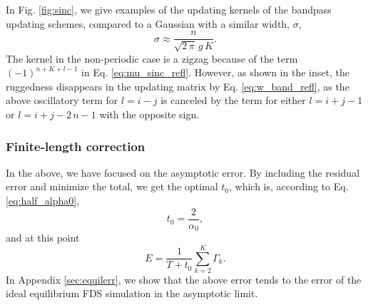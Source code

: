 \documentclass[reprint, floatfix]{revtex4-1}
\begin{document}
In Fig. \ref{fig:sinc},
we give examples of the updating kernels
of the bandpass updating schemes,
compared to a Gaussian
with a similar width, $\sigma$,
%
\begin{equation}
  \sigma
  \approx
  \frac
  {
    n
  }
  {
    \sqrt{ 2 \, \pi } \, g \, K
  }
  .
\label{eq:sigma_equiv}
\end{equation}
%
%
The kernel in the non-periodic case is a zigzag
because of the term $(-1)^{n+K+l-1}$
in Eq. \eqref{eq:mu_sinc_refl}.
%
However, as shown in the inset, %
the ruggedness disappears
in the updating matrix by Eq. \eqref{eq:w_band_refl},
as the above oscillatory term for $l = i - j$
is canceled by the term for either $l = i + j - 1$
or $l = i + j - 2 \, n - 1$
with the opposite sign.



\subsubsection{\label{sec:finlencorr}
Finite-length correction}



In the above, we have focused on
the asymptotic error.
%
By including the residual error
and minimize the total,
we get the optimal $t_0$,
which is, according to Eq. \eqref{eq:half_alpha0},
%
%
\begin{equation}
  t_0
  =
  \frac{     2    }
       { \alpha_0 }
  ,
\label{eq:t0_sinc}
\end{equation}
%
and at this point
%
\begin{equation}
  E
  =
  \frac{   1     }
       { T + t_0 }
  \sum_{ k = 2 }^K
    \Gamma_k
  .
\label{eq:error_sinc}
\end{equation}
%
In Appendix \ref{sec:equilerr},
we show that the above error tends
to the error of the ideal equilibrium FDS simulation
in the asymptotic limit.
\end{document}
